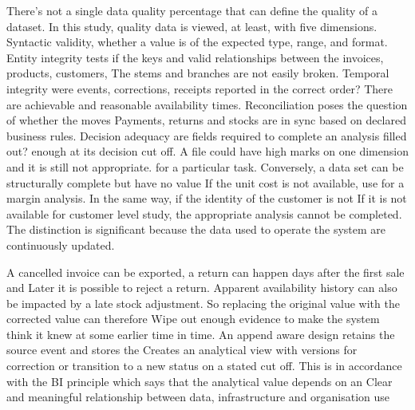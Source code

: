 \documentclass[a4paper,11pt,oneside]{book}
\theoremstyle{plain}
\theoremstyle{definition}
\theoremstyle{remark}
\begin{document}
There's not a single data quality percentage that can define the quality of a dataset. In this study, quality data is viewed, at least, with five dimensions. Syntactic validity, whether a value is of the expected type, range, and format. Entity integrity tests if the keys and valid relationships between the invoices, products, customers, The stems and branches are not easily broken. Temporal integrity were events, corrections, receipts reported in the correct order? There are achievable and reasonable availability times. Reconciliation poses the question of whether the moves Payments, returns and stocks are in sync based on declared business rules. Decision adequacy are fields required to complete an analysis filled out? enough at its decision cut off. A file could have high marks on one dimension and it is still not appropriate. for a particular task. Conversely, a data set can be structurally complete but have no value If the unit cost is not available, use for a margin analysis. In the same way, if the identity of the customer is not If it is not available for customer level study, the appropriate analysis cannot be completed. The distinction is significant because the data used to operate the system are continuously updated.

A cancelled invoice can be exported, a return can happen days after the first sale and Later it is possible to reject a return. Apparent availability history can also be impacted by a late stock adjustment. So replacing the original value with the corrected value can therefore Wipe out enough evidence to make the system think it knew at some earlier time in time. An append aware design retains the source event and stores the Creates an analytical view with versions for correction or transition to a new status on a stated cut off. This is in accordance with the BI principle which says that the analytical value depends on an Clear and meaningful relationship between data, infrastructure and organisation use \cite{chen2012business}
\end{document}
